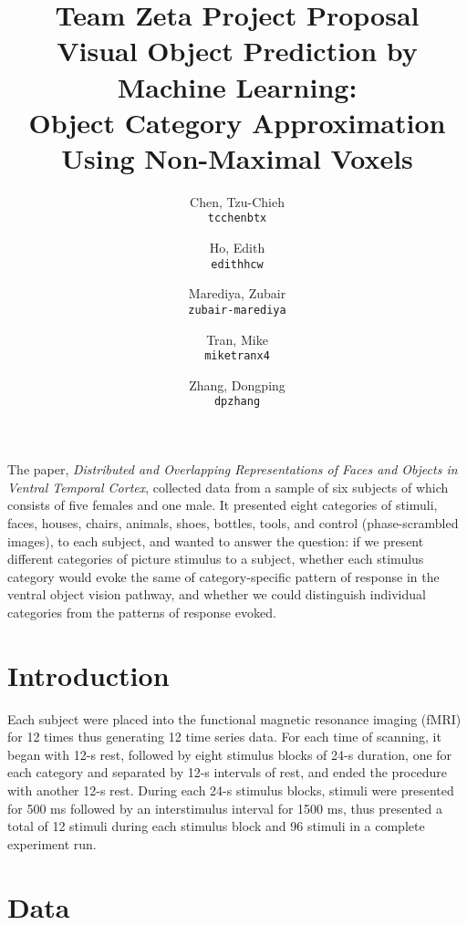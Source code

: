 \documentclass[11pt]{article}
\title{\textbf{Team Zeta Project Proposal}\\
Visual Object Prediction by Machine Learning:\\ 
Object Category Approximation Using Non-Maximal Voxels}
\author{
  Chen, Tzu-Chieh\\
  \texttt{tcchenbtx}
  \and
  Ho, Edith\\
  \texttt{edithhcw}
  \and
  Marediya, Zubair\\
  \texttt{zubair-marediya}
  \and
  Tran, Mike\\
  \texttt{miketranx4}
  \and
  Zhang, Dongping\\
  \texttt{dpzhang}
}
\begin{document}
\maketitle


The paper, \emph{Distributed and Overlapping Representations of Faces
and Objects in Ventral Temporal Cortex}\cite{object_rec_main}, collected data 
from a sample of six subjects of which consists of five females and one male. 
It presented eight categories of stimuli, faces, houses, chairs, animals, 
shoes, bottles, tools, and control (phase-scrambled images), to each subject, 
and wanted to answer the question: if we present different categories of 
picture stimulus to a subject, whether each stimulus category would evoke the 
same of category-specific pattern of response in the ventral object vision 
pathway, and whether we could distinguish individual categories from the 
patterns of response evoked. \\

\section{Introduction}

Each subject were placed into the functional 
magnetic resonance imaging (fMRI) for 12 times thus generating 12 time series 
data. For each time of scanning, it began with 12-s rest, followed by 
eight stimulus blocks of 24-s duration, one for each category and separated by 
12-s intervals of rest, and ended the procedure with another 12-s rest. During 
each 24-s stimulus blocks, stimuli were presented for 500 ms followed by an 
interstimulus interval for 1500 ms, thus presented a total of 12 stimuli during 
each stimulus block and 96 stimuli in a complete experiment run.\\

\section{Data}
\end{document}
